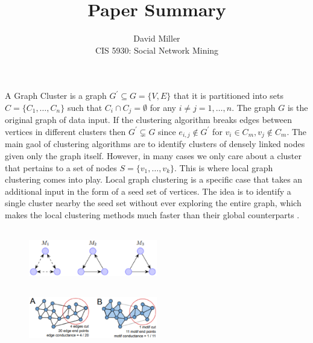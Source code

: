 \documentclass[12pt]{article}
\theoremstyle{remark}
\begin{document}
 
\title{Paper Summary}
\author{David Miller \\ 
CIS 5930: Social Network Mining} 

\maketitle

A Graph Cluster is a graph $G^\prime \subseteq G = \{V,E\}$ that it is partitioned into sets $C = \{C_1, \dots, C_n\}$ such that $C_i \cap C_j = \emptyset$ for any $i \neq j = 1, \dots, n$. The graph $G$ is the original graph of data input. If the clustering algorithm breaks edges between vertices in different clusters then $G^\prime \subsetneq G$ since $e_{i,j} \not\in G^\prime$ for $v_i \in C_m, v_j \not\in C_m$. The main gaol of clustering algorithms are to identify clusters of densely linked nodes given only the graph itself. However, in many cases we only care about a cluster that pertains to a set of nodes $S = \{v_1, \dots, v_k\}$. This is where local graph clustering comes into play. Local graph clustering is a specific case that takes an additional input in the form of a seed set of vertices. The idea is to identify a single cluster nearby the seed set without ever exploring the entire graph, which makes the local clustering methods much faster than their global counterparts \cite{paper}. 
\begin{figure}
	\vspace{-15pt}
	\hspace{0pt}
	\includegraphics[height=2.5cm,width=0.5\textwidth]{fig1.eps}
	\\
	\includegraphics[height=2.5cm,width=0.5\textwidth]{fig2.eps} 
	\caption{}
	\vspace{-14pt}
\end{figure} 
\end{document}

